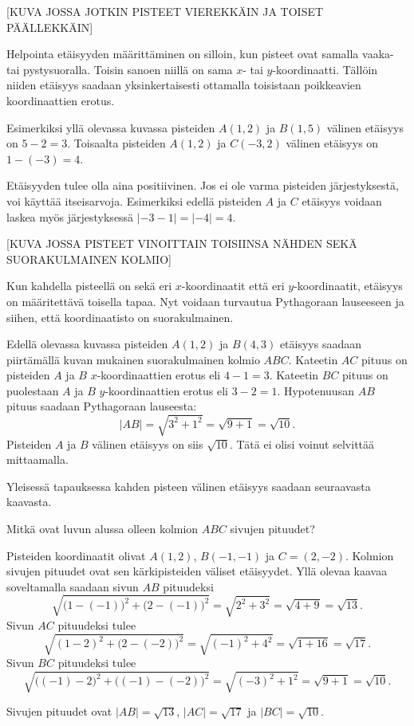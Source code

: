 [KUVA JOSSA JOTKIN PISTEET VIEREKKÄIN JA TOISET PÄÄLLEKKÄIN]

Helpointa etäisyyden määrittäminen on silloin, kun pisteet ovat samalla vaaka- tai pystysuoralla.
Toisin sanoen niillä on sama $x$- tai $y$-koordinaatti.
Tällöin niiden etäisyys saadaan yksinkertaisesti ottamalla toisistaan poikkeavien koordinaattien erotus.

Esimerkiksi yllä olevassa kuvassa pisteiden $A(1, 2)$ ja $B(1, 5)$ välinen etäisyys on $5-2=3$.
Toisaalta pisteiden $A(1, 2)$ ja $C(-3, 2)$ välinen etäisyys on $1-(-3)=4$.

Etäisyyden tulee olla aina positiivinen.
Jos ei ole varma pisteiden järjestyksestä, voi käyttää itseisarvoja.
Esimerkiksi edellä pisteiden $A$ ja $C$ etäisyys voidaan laskea myös järjestyksessä $|-3-1|=|-4|=4$.


[KUVA JOSSA PISTEET VINOITTAIN TOISIINSA NÄHDEN SEKÄ SUORAKULMAINEN KOLMIO]

Kun kahdella pisteellä on sekä eri $x$-koordinaatit että eri $y$-koordinaatit, etäisyys on määritettävä toisella tapaa.
Nyt voidaan turvautua Pythagoraan lauseeseen ja siihen, että koordinaatisto on suorakulmainen.

Edellä olevassa kuvassa pisteiden $A(1, 2)$ ja $B(4, 3)$ etäisyys saadaan piirtämällä kuvan mukainen suorakulmainen kolmio $ABC$.
Kateetin $AC$ pituus on pisteiden $A$ ja $B$ $x$-koordinaattien erotus eli $4-1=3$.
Kateetin $BC$ pituus on puolestaan $A$ ja $B$ $y$-koordinaattien erotus eli $3-2=1$.
Hypotenuusan $AB$ pituus saadaan Pythagoraan lauseesta:
\[
|AB|=\sqrt{3^2+1^2}=\sqrt{9+1}=\sqrt{10}.
\]
Pisteiden $A$ ja $B$ välinen etäisyys on siis $\sqrt{10}$.
Tätä ei olisi voinut selvittää mittaamalla.

Yleisessä tapauksessa kahden pisteen välinen etäisyys saadaan seuraavasta kaavasta.

\begin{esimerkki}
Mitkä ovat luvun alussa olleen kolmion $ABC$ sivujen pituudet?

\begin{esimratk}
Pisteiden koordinaatit olivat $A(1, 2)$, $B(-1, -1)$ ja $C=(2, -2)$.
Kolmion sivujen pituudet ovat sen kärkipisteiden väliset etäisyydet.
Yllä olevaa kaavaa soveltamalla saadaan sivun $AB$ pituudeksi
\[
\sqrt{\bigl(1-(-1)\bigr)^2+\bigl(2-(-1)\bigr)^2}=\sqrt{2^2+3^2}=\sqrt{4+9}=\sqrt{13}.
\]
Sivun $AC$ pituudeksi tulee
\[
\sqrt{(1-2)^2+\bigl(2-(-2)\bigr)^2}=\sqrt{(-1)^2+4^2}=\sqrt{1+16}=\sqrt{17}.
\]
Sivun $BC$ pituudeksi tulee
\[
\sqrt{\bigl((-1)-2\bigr)^2+\bigl((-1)-(-2)\bigr)^2}=\sqrt{(-3)^2+1^2}=\sqrt{9+1}=\sqrt{10}.
\]
\end{esimratk}

\begin{esimvast}
Sivujen pituudet ovat $|AB|=\sqrt{13}$, $|AC|=\sqrt{17}$ ja $|BC|=\sqrt{10}$.
\end{esimvast}
\end{esimerkki}

